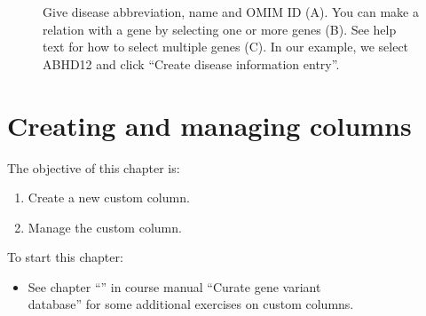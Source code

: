 \begin{figure}[ht]
  \begin{shaded}
		\caption{Give disease abbreviation, name and OMIM ID (A). \newline
		You can make a relation with a gene by selecting one or more genes (B).
		See help text for how to select multiple genes (C).
		In our example, we select ABHD12 and click ``Create disease information entry''.}
		\label{fig:create_disease_PHARC_II}
  \end{shaded}
\end{figure}










\chapter{Creating and managing columns}
The objective of this chapter is:
\begin{enumerate}
	\item 
	Create a new custom column.
	\item 
	Manage the custom column.
\end{enumerate}
To start this chapter:
\begin{itemize}
	\item 
	See chapter ``'' in course manual ``Curate gene variant \\
		database'' for some additional exercises on custom columns.
\end{itemize}

